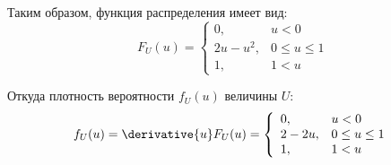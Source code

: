 \documentclass[a4paper,12pt]{article}
\begin{document}
\begin{enumerate}
        Таким образом, функция распределения имеет вид:
        \begin{equation}
            F_U(u)
            = \left \{
            \begin{array}{ll}
                0,         & u < 0         \\
                2 u - u^2, & 0 \le u \le 1 \\
                1,         & 1 < u
            \end{array}
            \right .
        \end{equation}

        Откуда плотность вероятности $f_U(u)$ величины $U$:
        \begin{equation}
            f_U(u)
            = \derivative{u} F_U(u)
            = \left \{
            \begin{array}{ll}
                0,      & u < 0         \\
                2 - 2u, & 0 \le u \le 1 \\
                1,      & 1 < u
            \end{array}
            \right .
        \end{equation}

%
    \end{enumerate}
\end{document}
